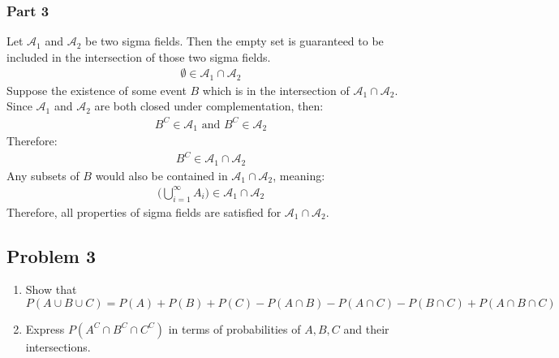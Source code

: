 \documentclass{article}
\begin{document}
\subsubsection*{Part 3}
Let $\mathcal{A}_1$ and $\mathcal{A}_2$ be two sigma fields. Then the empty set is guaranteed to be included in the intersection of those two sigma fields.
\begin{align*}
\emptyset \in \mathcal{A}_1 \cap \mathcal{A}_2
\end{align*}
Suppose the existence of some event $B$ which is in the intersection of $\mathcal{A}_1 \cap \mathcal{A}_2$. Since $\mathcal{A}_1$ and $\mathcal{A}_2$ are both closed under complementation, then:
\begin{align*}
B^{C} \in \mathcal{A}_1 \text{ and } B^{C} \in \mathcal{A}_2
\end{align*}
Therefore:
\begin{align*}
B^{C} \in \mathcal{A}_1 \cap \mathcal{A}_2
\end{align*}
Any subsets of $B$ would also be contained in $\mathcal{A}_1 \cap \mathcal{A}_2$, meaning:
\begin{align*}
\Bigg(\bigcup_{i=1}^{\infty}A_i \Bigg) \in \mathcal{A}_1 \cap \mathcal{A}_2
\end{align*}
Therefore, all properties of sigma fields are satisfied for $\mathcal{A}_1 \cap \mathcal{A}_2$.
\clearpage
\subsection*{Problem 3}
    \begin{enumerate}
    \item
      Show that\[
      P(A\cup B \cup C) = P(A) + P(B) + P(C) - P(A\cap B) - P(A\cap C) - P(B\cap C) + P(A\cap B \cap C)
      \]
    \item
      Express $P(A^C \cap B^C \cap C^C)$ in terms of probabilities of $A,B,C$ and their intersections.
    \end{enumerate}
\end{document}
